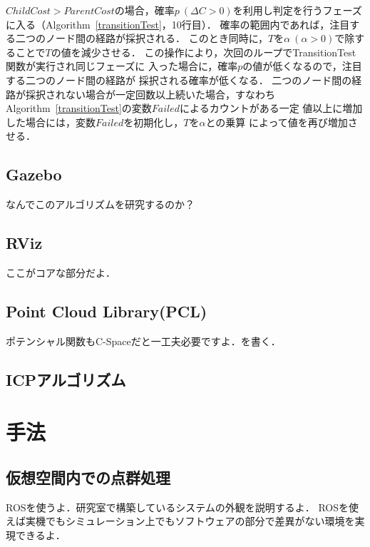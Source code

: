 \documentclass[a4paper,12pt]{jarticle}
\begin{document}
%
$ChildCost > ParentCost$の場合，確率$p\ (\Delta C >0)$を利用し判定を行うフェーズ
に入る（Algorithm~\ref{transitionTest}，10行目）．
%
確率の範囲内であれば，注目する二つのノード間の経路が採択される．
%
このとき同時に，$T$を$\alpha\ (\alpha>0)$で除することで$T$の値を減少させる．
%
この操作により，次回のループでTransitionTest関数が実行され同じフェーズに
入った場合に，確率$p$の値が低くなるので，注目する二つのノード間の経路が
採択される確率が低くなる．
%
二つのノード間の経路が採択されない場合が一定回数以上続いた場合，すなわち
Algorithm~\ref{transitionTest}の変数$Failed$によるカウントがある一定
値以上に増加した場合には，変数$Failed$を初期化し，$T$を$\alpha$との乗算
によって値を再び増加させる．

\subsection{Gazebo}
\label{sec:Gazebo}
なんでこのアルゴリズムを研究するのか？

\subsection{RViz}
\label{sec:RViz}
ここがコアな部分だよ．

\subsection{Point Cloud Library(PCL)}
\label{sec:Point Cloud Library(PCL)}
ポテンシャル関数もC-Spaceだと一工夫必要ですよ．を書く．


\subsection{ICPアルゴリズム}
\label{sec:ICPアルゴリズム}

\section{手法}
\label{sec:手法}
\subsection{仮想空間内での点群処理}
\label{sec:仮想空間内での点群処理}
ROSを使うよ．研究室で構築しているシステムの外観を説明するよ．
ROSを使えば実機でもシミュレーション上でもソフトウェアの部分で差異がない環境を実現できるよ．
\end{document}
